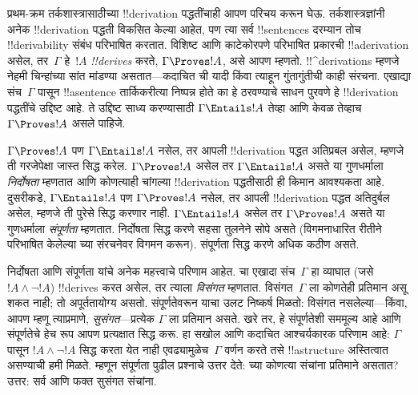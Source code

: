 \documentclass[../../../include/open-logic-section]{subfiles}
\begin{document}


प्रथम-क्रम तर्कशास्त्रासाठीच्या !!{derivation} पद्धतींचाही आपण परिचय करून
घेऊ. तर्कशास्त्रज्ञांनी अनेक !!{derivation} पद्धती विकसित केल्या आहेत,
पण त्या सर्व !!{sentence}s दरम्यान तोच !!{derivability} संबंध परिभाषित
करतात. विशिष्ट आणि काटेकोरपणे परिभाषित प्रकारची !!a{derivation} असेल,
तर~$\Gamma$ हे~$!A$ \emph{!!{derive}s} करते, $\Gamma \Proves !A$, असे
आपण म्हणतो. !!^{derivation}s म्हणजे नेहमी चिन्हांच्या सांत मांडण्या
असतात---कदाचित ची यादी किंवा त्याहून गुंतागुंतीची काही
संरचना. एखाद्या संच~$\Gamma$ पासून !!a{sentence} तार्किकरीत्या निष्पन्न
होते का हे ठरवण्याचे साधन पुरवणे हे !!{derivation} पद्धतींचे उद्दिष्ट
आहे. ते उद्दिष्ट साध्य करण्यासाठी $\Gamma \Entails !A$ तेव्हा आणि केवळ
तेव्हाच $\Gamma \Proves !A$ असले पाहिजे.

$\Gamma \Proves !A$ पण $\Gamma \Entails !A$ नसेल, तर आपली
!!{derivation} पद्धत अतिप्रबल असेल, म्हणजे ती गरजेपेक्षा जास्त सिद्ध
करेल. $\Gamma \Proves !A$ असेल तर $\Gamma \Entails !A$ असते या
गुणधर्माला \emph{निर्दोषता} म्हणतात आणि कोणत्याही चांगल्या
!!{derivation} पद्धतीसाठी ही किमान आवश्यकता आहे. दुसरीकडे,
$\Gamma \Entails !A$ पण $\Gamma \Proves !A$ नसेल, तर आपली
!!{derivation} पद्धत अतिदुर्बल असेल, म्हणजे ती पुरेसे सिद्ध करणार नाही.
$\Gamma \Entails !A$ असेल तर $\Gamma \Proves !A$ असते या गुणधर्माला
\emph{संपूर्णता} म्हणतात. निर्दोषता सिद्ध करणे सहसा तुलनेने सोपे असते
(विगमनाधारित रीतीने परिभाषित केलेल्या च्या संरचनेवर
विगमन करून). संपूर्णता सिद्ध करणे अधिक कठीण असते.

निर्दोषता आणि संपूर्णता यांचे अनेक महत्त्वाचे परिणाम आहेत.
चा एखादा संच~$\Gamma$ हा व्याघात (जसे
$!A \land \lnot !A$) !!{derive}s करत असेल, तर त्याला \emph{विसंगत}
म्हणतात. विसंगत~$\Gamma$ ला कोणतेही प्रतिमान असू शकत नाही; तो
अपूर्ततायोग्य असतो. संपूर्णतेवरून याचा उलट निष्कर्ष मिळतो: विसंगत
नसलेल्या---किंवा, आपण म्हणू त्याप्रमाणे, \emph{सुसंगत}---प्रत्येक
$\Gamma$ ला प्रतिमान असते. खरे तर, हे संपूर्णतेशी सममूल्य आहे आणि
संपूर्णतेचे हेच रूप आपण प्रत्यक्षात सिद्ध करू. हा सखोल आणि कदाचित
आश्चर्यकारक परिणाम आहे: $\Gamma$ पासून $!A \land \lnot !A$ सिद्ध करता
येत नाही एवढ्यामुळेच~$\Gamma$ वर्णन करते तसे !!a{structure} अस्तित्वात
असण्याची हमी मिळते. म्हणून संपूर्णता पुढील प्रश्नाचे उत्तर देते:
च्या कोणत्या संचांना प्रतिमाने असतात? उत्तर: सर्व आणि फक्त
सुसंगत संचांना.
\end{document}
